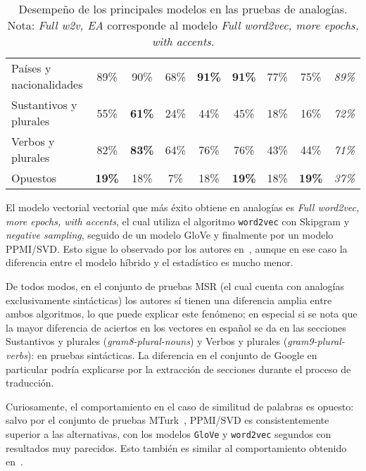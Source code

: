 \begin{table}[!h]
\begin{tabularx}{\textwidth}{Y*{7}{c}|c}
        Países y nacionalidades &
        89\% & 90\% & 68\% & \textbf{91\%} & \textbf{91\%} & 77\% & 75\% &
        \textit{89\%}\\
        Sustantivos y plurales &
        55\% & \textbf{61\%} & 24\% & 44\% & 45\% & 18\% & 16\% &
        \textit{72\%}\\
        Verbos y plurales &
        82\% & \textbf{83\%} & 64\% & 76\% & 76\% & 43\% & 44\% &
        \textit{71\%}\\
        Opuestos &
        \textbf{19\%} & 18\% & 7\% & 18\% & \textbf{19\%} & 18\% & \textbf{19\%} &
        \textit{37\%}\\
        \midrule
        \bottomrule
    \end{tabularx}
    \caption{Desempeño de los principales modelos en las pruebas de analogías.\\
    Nota: \textit{Full w2v, EA} corresponde al modelo \textit{Full word2vec, more epochs,
    with accents}.}
    \label{table:analogies_model_performance}
\end{table}

El modelo vectorial vectorial que más éxito obtiene en analogías es
\textit{Full word2vec, more epochs, with accents}, el cual utiliza el algoritmo \texttt{word2vec}
con Skipgram y \textit{negative sampling}, seguido de un modelo GloVe y finalmente por un modelo
PPMI/SVD\@. Esto sigue lo observado por los autores en~\cite{Levy2015}, aunque en ese caso la diferencia
entre el modelo híbrido y el estadístico es mucho menor.

De todos modos, en el conjunto de pruebas MSR (el cual cuenta con analogías exclusivamente
sintácticas) los autores sí tienen una diferencia amplia entre ambos algoritmos, lo que puede
explicar este fenómeno; en especial si se nota que la mayor diferencia de aciertos en los vectores
en español se da en las secciones Sustantivos y plurales (\textit{gram8-plural-nouns}) y Verbos y
plurales (\textit{gram9-plural-verbs}): en pruebas sintácticas. La diferencia en el conjunto de Google
en particular podría explicarse por la extracción de secciones durante el proceso de traducción.

Curiosamente, el comportamiento en el caso de similitud de palabras es opuesto: salvo por el
conjunto de pruebas MTurk~\cite{Radinsky2011}, PPMI/SVD es consistentemente superior a las alternativas,
con los modelos \texttt{GloVe} y \texttt{word2vec} segundos con resultados muy parecidos. Esto también
es similar al comportamiento obtenido en~\cite{Levy2015}.

